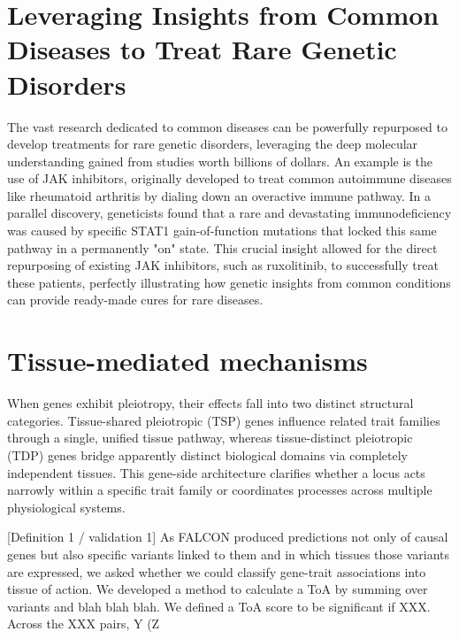 \section{Leveraging Insights from Common Diseases to Treat Rare Genetic Disorders}
\label{sec:common_rare}
The vast research dedicated to common diseases can be powerfully repurposed to develop treatments for rare genetic disorders, leveraging the deep molecular understanding gained from studies worth billions of dollars. An example is the use of JAK inhibitors, originally developed to treat common autoimmune diseases like rheumatoid arthritis by dialing down an overactive immune pathway. In a parallel discovery, geneticists found that a rare and devastating immunodeficiency was caused by specific STAT1 gain-of-function mutations that locked this same pathway in a permanently "on" state. This crucial insight allowed for the direct repurposing of existing JAK inhibitors, such as ruxolitinib, to successfully treat these patients, perfectly illustrating how genetic insights from common conditions can provide ready-made cures for rare diseases.
\section{Tissue-mediated mechanisms}
\label{sec:GTT}
When genes exhibit pleiotropy, their effects fall into two distinct structural categories. Tissue-shared pleiotropic (TSP) genes influence related trait families through a single, unified tissue pathway, whereas tissue-distinct pleiotropic (TDP) genes bridge apparently distinct biological domains via completely independent tissues. This gene-side architecture clarifies whether a locus acts narrowly within a specific trait family or coordinates processes across multiple physiological systems.

[Definition 1 / validation 1] As FALCON produced predictions not only of causal genes but also specific variants linked to them and in which tissues those variants are expressed, we asked whether we could classify gene-trait associations into tissue of action. We developed a method to calculate a ToA by summing over variants and blah blah blah. We defined a ToA score to be significant if XXX. Across the XXX pairs, Y (Z%

